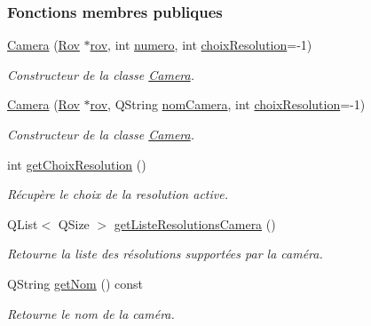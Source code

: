 \subsubsection*{Fonctions membres publiques}
\begin{DoxyCompactItemize}
\item 
\hyperlink{class_camera_a26c49f76c98ece6ad6771351dd13583a}{Camera} (\hyperlink{class_rov}{Rov} $\ast$\hyperlink{class_camera_ad1dde4d981877001281af01c392307f1}{rov}, int \hyperlink{class_camera_ae5cda5df3c9c49b88fff15389a1bbc64}{numero}, int \hyperlink{class_camera_a3fdddf6f548f04d7bdc26f32602a03d4}{choix\+Resolution}=-\/1)
\begin{DoxyCompactList}\small\item\em Constructeur de la classe \hyperlink{class_camera}{Camera}. \end{DoxyCompactList}\item 
\hyperlink{class_camera_ae663da224161d1a78c8a7431ad1530d7}{Camera} (\hyperlink{class_rov}{Rov} $\ast$\hyperlink{class_camera_ad1dde4d981877001281af01c392307f1}{rov}, Q\+String \hyperlink{class_camera_ac1cdaf82921d2a2f3f941d867718eba2}{nom\+Camera}, int \hyperlink{class_camera_a3fdddf6f548f04d7bdc26f32602a03d4}{choix\+Resolution}=-\/1)
\begin{DoxyCompactList}\small\item\em Constructeur de la classe \hyperlink{class_camera}{Camera}. \end{DoxyCompactList}\item 
int \hyperlink{class_camera_ab9f05b05c29416dce6471b5a03db98ea}{get\+Choix\+Resolution} ()
\begin{DoxyCompactList}\small\item\em Récupère le choix de la resolution active. \end{DoxyCompactList}\item 
Q\+List$<$ Q\+Size $>$ \hyperlink{class_camera_a997441a0c1e33fe3eda800953548071d}{get\+Liste\+Resolutions\+Camera} ()
\begin{DoxyCompactList}\small\item\em Retourne la liste des résolutions supportées par la caméra. \end{DoxyCompactList}\item 
Q\+String \hyperlink{class_camera_a9b27a8a444006f40548a9a4ecf4d7256}{get\+Nom} () const
\begin{DoxyCompactList}\small\item\em Retourne le nom de la caméra. \end{DoxyCompactList}\item 

\end{DoxyCompactItemize}
